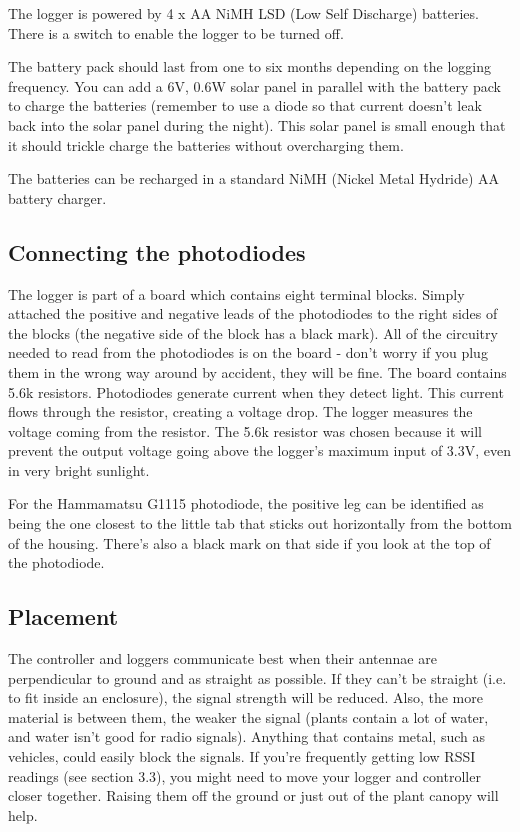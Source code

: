 \documentclass[10pt]{article}
\begin{document}
The logger is powered by 4 x AA NiMH LSD (Low Self Discharge) batteries. There is a switch to enable the logger to be turned off.

The battery pack should last from one to six months depending on the logging frequency. You can add a 6V, 0.6W solar panel in parallel with the battery pack to charge the batteries (remember to use a diode so that current doesn't leak back into the solar panel during the night). This solar panel is small enough that it should trickle charge the batteries without overcharging them.

The batteries can be recharged in a standard NiMH (Nickel Metal Hydride) AA battery charger.

\subsection{Connecting the photodiodes}

The logger is part of a board which contains eight terminal blocks. Simply attached the positive and negative leads of the photodiodes to the right sides of the blocks (the negative side of the block has a black mark). All of the circuitry needed to read from the photodiodes is on the board - don't worry if you plug them in the wrong way around by accident, they will be fine. The board contains 5.6k resistors. Photodiodes generate current when they detect light. This current flows through the resistor, creating a voltage drop. The logger measures the voltage coming from the resistor. The 5.6k resistor was chosen because it will prevent the output voltage going above the logger's maximum input of 3.3V, even in very bright sunlight.

For the Hammamatsu G1115 photodiode, the positive leg can be identified as being the one closest to the little tab that sticks out horizontally from the bottom of the housing. There's also a black mark on that side if you look at the top of the photodiode.

\subsection{Placement}

The controller and loggers communicate best when their antennae are perpendicular to ground and as straight as possible. If they can't be straight (i.e. to fit inside an enclosure), the signal strength will be reduced. Also, the more material is between them, the weaker the signal (plants contain a lot of water, and water isn't good for radio signals). Anything that contains metal, such as vehicles, could easily block the signals. If you're frequently getting low RSSI readings (see section 3.3), you might need to move your logger and controller closer together. Raising them off the ground or just out of the plant canopy will help.
\end{document}

